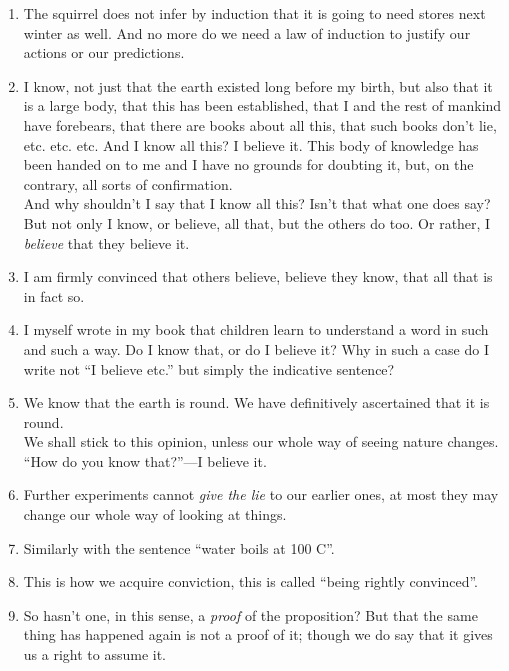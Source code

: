 \documentclass{book}
\begin{document}
\begin{enumerate}
\item
The squirrel does not infer by induction that it is going to need stores next
winter as well. And no more do we need a law of induction to justify our
actions or our predictions.

\item
I know, not just that the earth existed long before my birth, but also that it
is a large body, that this has been established, that I and the rest of mankind
have forebears, that there are books about all this, that such books don't lie,
etc. etc. etc. And I know all this? I believe it. This body of knowledge has
been handed on to me and I have no grounds for doubting it, but, on the
contrary, all sorts of confirmation. \\
And why shouldn't I say that I know all this? Isn't that what one does say?
But not only I know, or believe, all that, but the others do too. Or rather, I
\emph{believe} that they believe it.

\item
I am firmly convinced that others believe, believe they know, that all that is
in fact so.

\item
I myself wrote in my book that children learn to understand a word in such and
such a way. Do I know that, or do I believe it? Why in such a case do I write
not ``I believe etc.'' but simply the indicative sentence?

\item
We know that the earth is round. We have definitively ascertained that it is
round. \\
We shall stick to this opinion, unless our whole way of seeing nature changes.
``How do you know that?''---I believe it.

\item
Further experiments cannot \emph{give the lie} to our earlier ones, at most
they may change our whole way of looking at things.

\item
Similarly with the sentence ``water boils at 100 C''.

\item
This is how we acquire conviction, this is called ``being rightly convinced''.

\item
So hasn't one, in this sense, a \emph{proof} of the proposition? But that the
same thing has happened again is not a proof of it; though we do say that it
gives us a right to assume it.


\end{enumerate}
\end{document}
